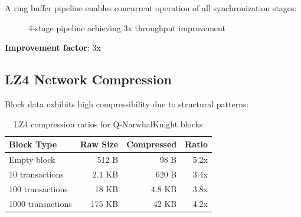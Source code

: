 \documentclass[11pt,a4paper]{article}
\begin{document}
A ring buffer pipeline enables concurrent operation of all synchronization stages:

\begin{figure}[h]
\centering
{}
\caption{4-stage pipeline achieving 3x throughput improvement}
\end{figure}

\textbf{Improvement factor}: 3x

\subsection{LZ4 Network Compression}

Block data exhibits high compressibility due to structural patterns:

\begin{table}[h]
\centering
\begin{tabular}{lrrr}
\toprule
\textbf{Block Type} & \textbf{Raw Size} & \textbf{Compressed} & \textbf{Ratio} \\
\midrule
Empty block & 512 B & 98 B & 5.2x \\
10 transactions & 2.1 KB & 620 B & 3.4x \\
100 transactions & 18 KB & 4.8 KB & 3.8x \\
1000 transactions & 175 KB & 42 KB & 4.2x \\
\bottomrule
\end{tabular}
\caption{LZ4 compression ratios for Q-NarwhalKnight blocks}
\end{table}
\end{document}
